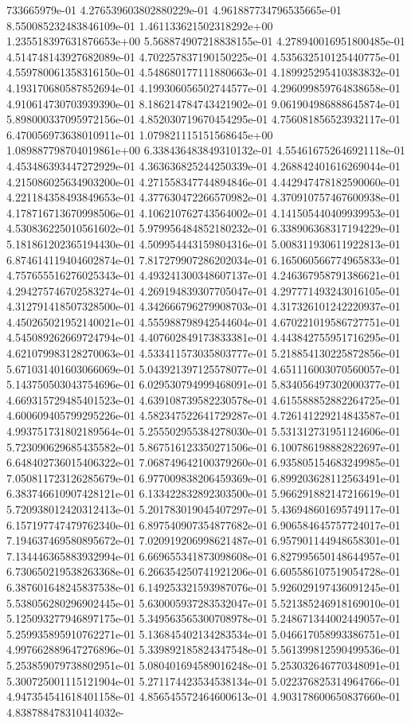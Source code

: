 733665979e-01	4.276539603802880229e-01	4.961887734796535665e-01	8.550085232483846109e-01	1.461133621502318292e+00	1.235518397631876653e+00	5.568874907218838155e-01	4.278940016951800485e-01	4.514748143927682089e-01	4.702257837190150225e-01	4.535632510125440775e-01	4.559780061358316150e-01	4.548680177111880663e-01	4.189925295410383832e-01	4.193170680587852694e-01	4.199306056502744577e-01	4.296099859764838658e-01	4.910614730703939390e-01	8.186214784743421902e-01	9.061904986888645874e-01	5.898000337095972156e-01	4.852030719670454295e-01	4.756081856523932117e-01	6.470056973638010911e-01	1.079821115151568645e+00	1.089887798704019861e+00	6.338436483849310132e-01	4.554616752646921118e-01	4.453486393447272929e-01	4.363636825244250339e-01	4.268842401616269044e-01	4.215086025634903200e-01	4.271558347744894846e-01	4.442947478182590060e-01	4.221184358493849653e-01	4.377630472266570982e-01	4.370910757467600938e-01	4.178716713670998506e-01	4.106210762743564002e-01	4.141505440409939953e-01	4.530836225010561602e-01	5.979956484852180232e-01	6.338906368317194229e-01	5.181861202365194430e-01	4.509954443159804316e-01	5.008311930611922813e-01	6.874614119404602874e-01	7.817279907286202034e-01	6.165060566774965833e-01	4.757655516276025343e-01	4.493241300348607137e-01	4.246367958791386621e-01	4.294275746702583274e-01	4.269194839307705047e-01	4.297771493243016105e-01	4.312791418507328500e-01	4.342666796279908703e-01	4.317326101242220937e-01	4.450265021952140021e-01	4.555988798942544604e-01	4.670221019586727751e-01	4.545089262669724794e-01	4.407602849173833381e-01	4.443842755951716295e-01	4.621079983128270063e-01	4.533411573035803777e-01	5.218854130225872856e-01	5.671031401603066069e-01	5.043921397125578077e-01	4.651116003070560057e-01	5.143750503043754696e-01	6.029530794999468091e-01	5.834056497302000377e-01	4.669315729485401523e-01	4.639108739582230578e-01	4.615588852882264725e-01	4.600609405799295226e-01	4.582347522641729287e-01	4.726141229214843587e-01	4.993751731802189564e-01	5.255502955384278030e-01	5.531312731951124606e-01	5.723090629685435582e-01	5.867516123350271506e-01	6.100786198882822697e-01	6.648402736015406322e-01	7.068749642100379260e-01	6.935805154683249985e-01	7.050811723126285679e-01	6.977009838206459369e-01	6.899203628112563491e-01	6.383746610907428121e-01	6.133422832892303500e-01	5.966291882147216619e-01	5.720938012420312413e-01	5.201783019045407297e-01	5.436948601695749117e-01	6.157197747479762340e-01	6.897540907354877682e-01	6.906584645757724017e-01	7.194637469580895672e-01	7.020919206998621487e-01	6.957901144948658301e-01	7.134446365883932994e-01	6.669655341873098608e-01	6.827995650148644957e-01	6.730650219538263368e-01	6.266354250741921206e-01	6.605586107519054728e-01	6.387601648245837538e-01	6.149253321593987076e-01	5.926029197436091245e-01	5.538056280296902445e-01	5.630005937283532047e-01	5.521385246918169010e-01	5.125093277946897175e-01	5.349563565300708978e-01	5.248671344002449057e-01	5.259935895910762271e-01	5.136845402134283534e-01	5.046617058993386751e-01	4.997662889647276896e-01	5.339892185824347548e-01	5.561399812590499536e-01	5.253859079738802951e-01	5.080401694589016248e-01	5.253032646770348091e-01	5.300725001115121904e-01	5.271174423534538134e-01	5.022376825314964766e-01	4.947354541618401158e-01	4.856545572464600613e-01	4.903178600650837660e-01	4.838788478310414032e-
